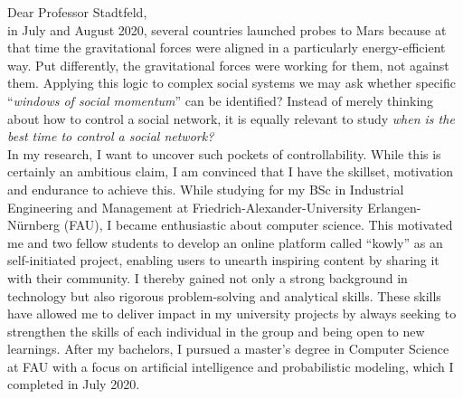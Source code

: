 Dear Professor Stadtfeld,\\

in July and August 2020, several countries launched probes to Mars because at that time the gravitational forces were aligned in a particularly energy-efficient way. 
Put differently, the gravitational forces were working for them, not against them.
Applying this logic to complex social systems we may ask whether specific ``\textit{windows of social momentum}'' can be identified? 
Instead of merely thinking about how to control a social network, it is equally relevant to study \textit{when is the best time to control a social network?}\\

In my research, I want to uncover such pockets of controllability. 
While this is certainly an ambitious claim, I am convinced that I have the skillset, motivation and endurance to achieve this. 
While studying for my BSc in Industrial Engineering and Management at Friedrich-Alexander-University Erlangen-Nürnberg (FAU), I became enthusiastic about computer science. 
This motivated me and two fellow students to develop an online platform called ``kowly'' as an self-initiated project, enabling users to unearth inspiring content by sharing it with their community. 
I thereby gained not only a strong background in technology but also rigorous problem-solving and analytical skills. 
These skills have allowed me to deliver impact in my university projects by always seeking to strengthen the skills of each individual in the group and being open to new learnings. 
After my bachelors, I pursued a master's degree in Computer Science at FAU with a focus on artificial intelligence and probabilistic modeling, which I completed in July 2020. \\

